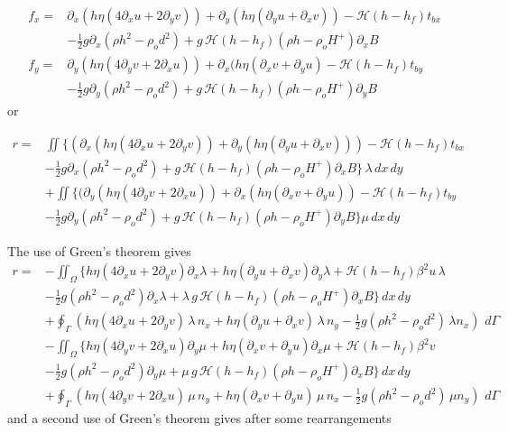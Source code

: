 \documentclass[10pt,a4paper]{book}
\newcommand{\He}{\mathcal{H}}
\newcommand{\p}{\partial}
\newcommand{\tbx}{t_{bx}}
\newcommand{\tby}{t_{by}}
\begin{document}
\begin{align} 
f_x=&\p_x ( h \eta ( 4 \p_x u + 2 \p_y v)) + \p_y ( h \eta (\p_y u + \p_x v) ) - \He(h-h_f) \tbx  \nonumber \\
&-\frac{1}{2} g \p_x (\rho h^2 - \rho_o d^2)+ g\,\He(h-h_f) (\rho h -\rho_o H^{+}) \p_x B 
\label{eq:A1x}\\
f_y=&\p_y (  h \eta ( 4 \p_y v + 2 \p_x u )) +\p_x ( h \eta (\p_x v + \p_y u ) - \He(h-h_f) \tby  \nonumber \\
&-\frac{1}{2} g \p_y (\rho h^2 - \rho_o d^2)+g\,\He(h-h_f) (\rho h -\rho_o H^{+}) \p_y B
\label{eq:A1y}
\end{align}
or

\begin{align*}
r=& \iint  \big \{ ( \p_x ( h \eta ( 4 \p_x u + 2 \p_y v)) + \p_y ( h \eta (\p_y u + \p_x v) )) - \He(h-h_f) \tbx   \nonumber \\
&-\frac{1}{2} g \p_x (\rho h^2 - \rho_o d^2)+ g\,\He(h-h_f) (\rho h -\rho_o H^{+}) \p_x B \big \} \, \lambda \, dx \, dy \nonumber \\
&+ \iint \big \{ (\p_y (  h \eta ( 4 \p_y v + 2 \p_x u )) +\p_x ( h \eta (\p_x v + \p_y u ) ) - \He(h-h_f) \tby  \nonumber \\
&-\frac{1}{2} g \p_y (\rho h^2 - \rho_o d^2)+g\,\He(h-h_f) (\rho h -\rho_o H^{+}) \p_y B \big \} \mu \, dx \, dy
\end{align*}




The use of Green's theorem gives
\begin{align} 
r=& -\iint_{\Omega} \big \{ h \eta ( 4 \p_x u + 2 \p_y v ) \p_x \lambda +  h \eta (\p_y u + \p_x v) \p_y \lambda + \He(h-h_f) \beta^2 u \, \lambda \nonumber \\
  &- \frac{1}{2} g (\rho h^2 - \rho_o d^2) \p_x \lambda   + \lambda \, g\,\He(h-h_f) (\rho h -\rho_o H^{+}) \p_x B \big \} \, dx \, dy \nonumber \\
  &+ \oint_{\Gamma} (h \eta ( 4\p_x u + 2 \p_y v) \, \lambda \, n_x+  h \eta (\p_y u + \p_x v) \, \lambda \, n_y- \frac{1}{2} g (\rho h^2 - \rho_o d^2) \, \lambda n_x)\, \, d\Gamma \nonumber \\
  &- \iint_{\Omega} \big \{ h \eta ( 4 \p_y v + 2 \p_x u ) \p_y \mu +  h \eta (\p_x v + \p_y u) \p_x \mu + \He(h-h_f) \beta^2 v \,  \nonumber \\
  &- \frac{1}{2} g (\rho h^2 - \rho_o d^2) \p_y \mu   + \mu \, g\,\He(h-h_f) (\rho h -\rho_o H^{+}) \p_x B \big \}  \, dx \, dy \nonumber \\
  &+ \oint_{\Gamma} (h \eta ( 4\p_y v + 2 \p_x u) \, \mu \, n_y+  h \eta (\p_x v + \p_y u) \, \mu \, n_x- \frac{1}{2} g (\rho h^2 - \rho_o d^2) \, \mu n_y)\, \, d\Gamma \nonumber
\end{align}
and a second use of Green's theorem gives after some rearrangements
\end{document}
